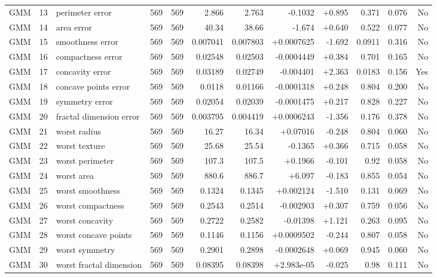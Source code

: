 \begin{landscape}
\begin{longtable}{@{}lrp{4.0cm}rrrrrrrrr@{}}
GMM & 13 & perimeter error & 569 & 569 & 2.866 & 2.763 & -0.1032 & +0.895 & 0.371 & 0.076 & No \\
GMM & 14 & area error & 569 & 569 & 40.34 & 38.66 & -1.674 & +0.640 & 0.522 & 0.077 & No \\
GMM & 15 & smoothness error & 569 & 569 & 0.007041 & 0.007803 & +0.0007625 & -1.692 & 0.0911 & 0.316 & No \\
GMM & 16 & compactness error & 569 & 569 & 0.02548 & 0.02503 & -0.0004449 & +0.384 & 0.701 & 0.165 & No \\
GMM & 17 & concavity error & 569 & 569 & 0.03189 & 0.02749 & -0.004401 & +2.363 & 0.0183 & 0.156 & Yes \\
GMM & 18 & concave points error & 569 & 569 & 0.0118 & 0.01166 & -0.0001318 & +0.248 & 0.804 & 0.200 & No \\
GMM & 19 & symmetry error & 569 & 569 & 0.02054 & 0.02039 & -0.0001475 & +0.217 & 0.828 & 0.227 & No \\
GMM & 20 & fractal dimension error & 569 & 569 & 0.003795 & 0.004419 & +0.0006243 & -1.356 & 0.176 & 0.378 & No \\
GMM & 21 & worst radius & 569 & 569 & 16.27 & 16.34 & +0.07016 & -0.248 & 0.804 & 0.060 & No \\
GMM & 22 & worst texture & 569 & 569 & 25.68 & 25.54 & -0.1365 & +0.366 & 0.715 & 0.058 & No \\
GMM & 23 & worst perimeter & 569 & 569 & 107.3 & 107.5 & +0.1966 & -0.101 & 0.92 & 0.058 & No \\
GMM & 24 & worst area & 569 & 569 & 880.6 & 886.7 & +6.097 & -0.183 & 0.855 & 0.054 & No \\
GMM & 25 & worst smoothness & 569 & 569 & 0.1324 & 0.1345 & +0.002124 & -1.510 & 0.131 & 0.069 & No \\
GMM & 26 & worst compactness & 569 & 569 & 0.2543 & 0.2514 & -0.002903 & +0.307 & 0.759 & 0.056 & No \\
GMM & 27 & worst concavity & 569 & 569 & 0.2722 & 0.2582 & -0.01398 & +1.121 & 0.263 & 0.095 & No \\
GMM & 28 & worst concave points & 569 & 569 & 0.1146 & 0.1156 & +0.0009502 & -0.244 & 0.807 & 0.058 & No \\
GMM & 29 & worst symmetry & 569 & 569 & 0.2901 & 0.2898 & -0.0002648 & +0.069 & 0.945 & 0.060 & No \\
GMM & 30 & worst fractal dimension & 569 & 569 & 0.08395 & 0.08398 & +2.983e-05 & -0.025 & 0.98 & 0.111 & No \\
\end{longtable}
\endgroup
\end{landscape}
